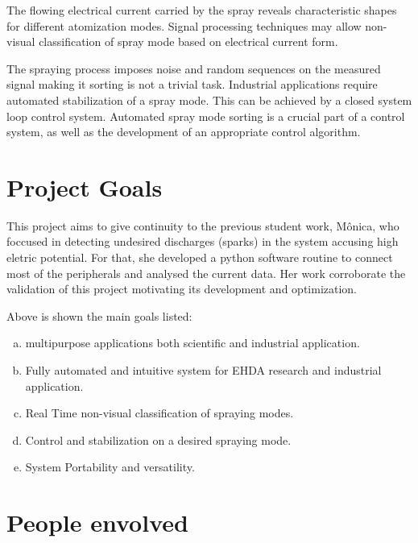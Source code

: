 The flowing electrical current carried by the spray reveals characteristic shapes for different atomization modes.
Signal processing techniques may allow non-visual classification of spray mode based on electrical current form. 

The spraying process imposes noise and random sequences on the measured signal making it sorting is not a trivial task.
Industrial applications require automated stabilization of a spray mode. 
This can be achieved by a closed system loop control system. 
Automated spray mode sorting is a crucial part of a control system, as well as the development of an appropriate control algorithm.

\section{Project Goals}
\label{sec:goals}

This project aims to give continuity to the previous student work\cite{Monica}, 
Mônica, who foccused in detecting undesired discharges (sparks) in the system accusing high eletric potential. 
For that, she developed a python software routine to connect most of the peripherals and analysed the current data.
Her work corroborate the validation of this project motivating its development and optimization.

Above is shown the main goals listed:

\begin{enumerate}[a)]
\item multipurpose applications both scientific and industrial application.
\item Fully automated and intuitive system for EHDA research and industrial application.
\item Real Time non-visual classification of spraying modes.
\item Control and stabilization on a desired spraying mode.   
\item System Portability and versatility.
\end{enumerate}

\section{People envolved}
\label{sec:companies}


